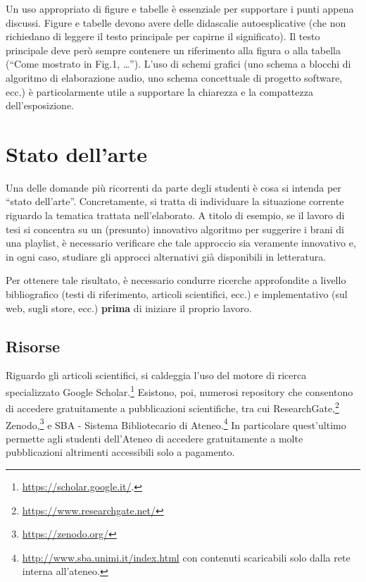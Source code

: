 \documentclass[12pt]{report}
\begin{document}
Un uso appropriato di figure e tabelle \`e essenziale per supportare i punti appena discussi. Figure e tabelle devono avere delle didascalie autoesplicative (che non richiedano di leggere il testo principale per capirne il significato). Il testo principale deve per\`o sempre contenere un riferimento alla figura o alla tabella (``Come mostrato in Fig.1, \ldots''). L'uso di schemi grafici (uno schema a blocchi di algoritmo di elaborazione audio, uno schema concettuale di progetto software, ecc.) \`e particolarmente utile a supportare la chiarezza e la compattezza dell'esposizione. 

% 
% 

\chapter{Stato dell'arte}
\label{chap:stato_arte}


Una delle domande più ricorrenti da parte degli studenti \`e cosa si intenda per ``stato dell'arte''. Concretamente, si tratta di individuare la situazione corrente riguardo la tematica trattata nell'elaborato. A titolo di esempio, se il lavoro di tesi si concentra su un (presunto) innovativo algoritmo per suggerire i brani di una playlist, è necessario verificare che tale approccio sia veramente innovativo e, in ogni caso, studiare gli approcci alternativi già disponibili in letteratura.

Per ottenere tale risultato, è necessario condurre ricerche approfondite a livello bibliografico (testi di riferimento, articoli scientifici, ecc.) e implementativo (sul web, sugli store, ecc.) \textbf{prima} di iniziare il proprio lavoro.

\section{Risorse}

Riguardo gli articoli scientifici, si caldeggia l'uso del motore di ricerca specializzato Google Scholar.\footnote{\url{https://scholar.google.it/}.} Esistono, poi, numerosi repository che consentono di accedere gratuitamente a pubblicazioni scientifiche, tra cui ResearchGate,\footnote{\url{https://www.researchgate.net/}} Zenodo,\footnote{\url{https://zenodo.org/}} e SBA - Sistema Bibliotecario di Ateneo.\footnote{\url{http://www.sba.unimi.it/index.html} con contenuti scaricabili solo dalla rete interna all'ateneo.} In particolare quest'ultimo permette agli studenti dell'Ateneo di accedere gratuitamente a molte pubblicazioni altrimenti accessibili solo a pagamento.
\end{document}
